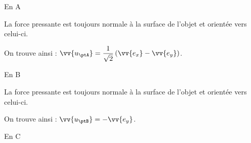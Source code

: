                                \finalisationDuPartageDePage %


\debutEntrainement


\begin{enonce}
En A
\end{enonce}

%

\begin{corrige}
La force pressante est toujours normale à la surface de l'objet
et orientée vers celui-ci. 

On trouve ainsi : $\vv{u_{\ptA}}=\dfrac{1}{\sqrt{2}}\left(\vv{e_{x}}-\vv{e_{y}}\right)$.
\end{corrige}



\begin{enonce}
En B
\end{enonce}


\begin{corrige}
La force pressante est toujours normale à la surface de l'objet
et orientée vers celui-ci. 

On trouve ainsi : $\vv{u_{\ptB}}=-\vv{e_{y}}$.
\end{corrige}



\begin{enonce}
En C
\end{enonce}

%

